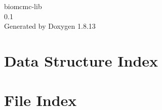 \documentclass[twoside]{article}
\newcommand{\+}{\discretionary{\mbox{\scriptsize$\hookleftarrow$}}{}{}}
\begin{document}
\hypersetup{pageanchor=false,
             bookmarksnumbered=true,
             pdfencoding=unicode
            }
\begin{titlepage}
\vspace*{7cm}
\begin{center}%
{\Large biomcmc-\/lib \\[1ex]\large 0.\+1 }\\
\vspace*{1cm}
{\large Generated by Doxygen 1.8.13}\\
\end{center}
\end{titlepage}
\tableofcontents
{}
\hypersetup{pageanchor=true}

\section{Data Structure Index}

\section{File Index}

\end{document}
